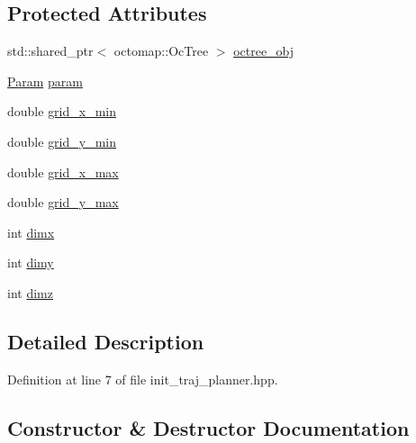 \subsection*{Protected Attributes}
\begin{DoxyCompactItemize}
\item 
std\+::shared\+\_\+ptr$<$ octomap\+::\+Oc\+Tree $>$ \hyperlink{classlib_corridor_gen_1_1_init_traj_planner_a65b1c7c71ee2e55f5e8f7fc1594ba5c9}{octree\+\_\+obj}
\item 
\hyperlink{classlib_corridor_gen_1_1_param}{Param} \hyperlink{classlib_corridor_gen_1_1_init_traj_planner_a2c750ddb7bf244207d43661bda42e1fc}{param}
\item 
double \hyperlink{classlib_corridor_gen_1_1_init_traj_planner_aeb9655c063038a5842fb0b37c52b13dd}{grid\+\_\+x\+\_\+min}
\item 
double \hyperlink{classlib_corridor_gen_1_1_init_traj_planner_aeee7d6390274ab012a2e2158807d0c39}{grid\+\_\+y\+\_\+min}
\item 
double \hyperlink{classlib_corridor_gen_1_1_init_traj_planner_ae02d30b4edf55e3c26a768681403002c}{grid\+\_\+x\+\_\+max}
\item 
double \hyperlink{classlib_corridor_gen_1_1_init_traj_planner_a57a231a6bda58e0d1f281e61c8a9ac5e}{grid\+\_\+y\+\_\+max}
\item 
int \hyperlink{classlib_corridor_gen_1_1_init_traj_planner_a3575a01c82d6d07c08de34219455ef5d}{dimx}
\item 
int \hyperlink{classlib_corridor_gen_1_1_init_traj_planner_ad74c8d5ea299747a09ec949ccb01fa11}{dimy}
\item 
int \hyperlink{classlib_corridor_gen_1_1_init_traj_planner_a3a1684481f8489002dfd1c66c01ccb56}{dimz}
\end{DoxyCompactItemize}


\subsection{Detailed Description}


Definition at line 7 of file init\+\_\+traj\+\_\+planner.\+hpp.



\subsection{Constructor \& Destructor Documentation}
\mbox{\label{classlib_corridor_gen_1_1_init_traj_planner_a0ed77a8c723523592a3c2281dc576b17}} 
